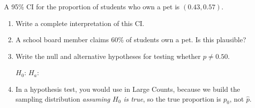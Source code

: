 \documentclass[10pt]{article}
\begin{document}
\namedateperiod

\vspace{0.15in}

A 95\% CI for the proportion of students who own a pet is $(0.43, 0.57)$.

\begin{enumerate}
  \item Write a complete interpretation of this CI.

  \item A school board member claims 60\% of students own a pet. Is this plausible?

  \item Write the null and alternative hypotheses for testing whether $p \ne 0.50$.

        $H_0$:   \quad $H_a$: 

  \item In a hypothesis test, you would use  in Large Counts,
        because we build the sampling distribution \emph{assuming $H_0$ is true}, so the true
        proportion is $p_0$, not $\hat p$.
\end{enumerate}
\end{document}
